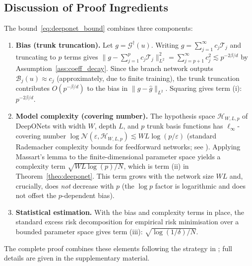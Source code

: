 \documentclass[12pt,a4paper]{article}
\begin{document}
\subsection{Discussion of Proof Ingredients}
\label{sec:proof_ingredients}

The bound~\eqref{eq:deeponet_bound} combines three components:

\begin{enumerate}
    \item \textbf{Bias (trunk truncation).}
        Let $g = \mathcal{G}^\dagger(u)$.  Writing $g = \sum_{j=1}^\infty c_j \mathcal{T}_j$
        and truncating to $p$ terms gives
        $\|g - \sum_{j=1}^p c_j \mathcal{T}_j\|_{L^2}^2
        = \sum_{j=p+1}^\infty c_j^2
        \lesssim p^{-2\beta/d}$
        by Assumption~\ref{ass:coeff_decay}.
        Since the branch network outputs $\mathcal{B}_j(u) \approx c_j$
        (approximately, due to finite training), the trunk truncation contributes
        $O(p^{-\beta/d})$ to the bias in $\|g - \hat g\|_{L^2}$.
        Squaring gives term (i): $p^{-2\beta/d}$.

    \item \textbf{Model complexity (covering number).}
        The hypothesis space $\mathcal{H}_{W,L,p}$ of DeepONets with
        width $W$, depth $L$, and $p$ trunk basis functions has
        $\ell_\infty$-covering number
        $\log \mathcal{N}(\varepsilon, \mathcal{H}_{W,L,p})
        \lesssim WL \log(p/\varepsilon)$
        (standard Rademacher complexity bounds for feedforward networks;
        see \citet{golowich2018size,barron2019complexity}).
        Applying Massart's lemma \citep{massart2000rademacher} to the
        finite-dimensional parameter space yields a complexity term
        $\sqrt{WL\log(p)/N}$, which is term (ii) in Theorem~\ref{theo:deeponet}.
        This term grows with the network size $WL$ and, crucially,
        does \emph{not} decrease with $p$ (the $\log p$ factor is logarithmic
        and does not offset the $p$-dependent bias).

    \item \textbf{Statistical estimation.}
        With the bias and complexity terms in place,
        the standard excess risk decomposition for empirical risk
        minimisation over a bounded parameter space gives term (iii):
        $\sqrt{\log(1/\delta)/N}$.
\end{enumerate}

The complete proof combines these elements following the strategy in
\citet{brugiapaglia2026tour,kissas2023operator}; full details are given
in the supplementary material.
\end{document}
